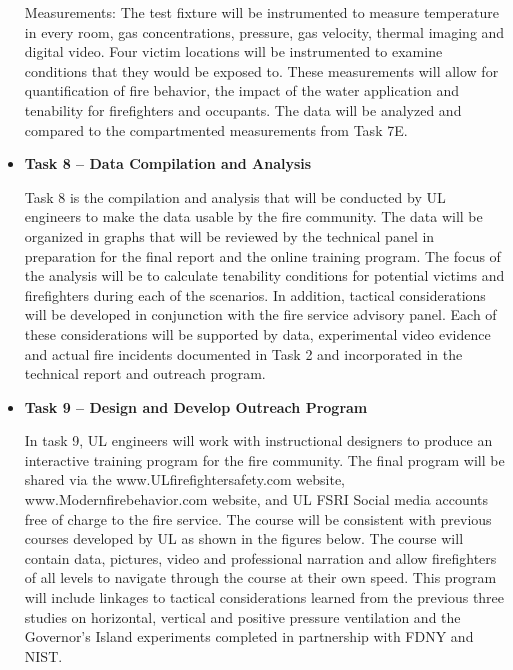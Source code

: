 \documentclass{article}
\begin{document}
\begin{itemize}
Measurements:  The test fixture will be instrumented to measure temperature in every room, gas concentrations, pressure, gas velocity, thermal imaging and digital video. Four victim locations will be instrumented to examine conditions that they would be exposed to. These measurements will allow for quantification of fire behavior, the impact of the water application and tenability for firefighters and occupants. The data will be analyzed and compared to the compartmented measurements from Task 7E.
\vspace*{\baselineskip}
 
\item \bf{Task 8 – Data Compilation and Analysis}
\normalfont
\vspace*{\baselineskip}

Task 8 is the compilation and analysis that will be conducted by UL engineers to make the data usable by the fire community. The data will be organized in graphs that will be reviewed by the technical panel in preparation for the final report and the online training program. The focus of the analysis will be to calculate tenability conditions for potential victims and firefighters during each of the scenarios. In addition, tactical considerations will be developed in conjunction with the fire service advisory panel. Each of these considerations will be supported by data, experimental video evidence and actual fire incidents documented in Task 2 and incorporated in the technical report and outreach program.
\vspace*{\baselineskip}

\item \bf{Task 9 – Design and Develop Outreach Program}
\normalfont
\vspace*{\baselineskip}

In task 9, UL engineers will work with instructional designers to produce an interactive training program for the fire community. The final program will be shared via the www.ULfirefightersafety.com website, www.Modernfirebehavior.com website, and UL FSRI Social media accounts free of charge to the fire service. The course will be consistent with previous courses developed by UL as shown in the figures below. The course will contain data, pictures, video and professional narration and allow firefighters of all levels to navigate through the course at their own speed. This program will include linkages to tactical considerations learned from the previous three studies on horizontal, vertical and positive pressure ventilation and the Governor’s Island experiments completed in partnership with FDNY and NIST.
\vspace*{\baselineskip}


\end{itemize}
\end{document}
